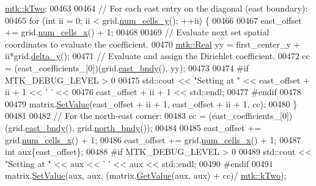 \begin{DoxyCode}
      \hyperlink{group__c01-roots_gaf39c2d851a2db744f4feb1c5ab3ec2cf}{mtk::kTwo};
00463 
00464     \textcolor{comment}{// For each east entry on the diagonal (east boundary):}
00465     \textcolor{keywordflow}{for} (\textcolor{keywordtype}{int} ii = 0; ii < grid.\hyperlink{classmtk_1_1UniStgGrid2D_aed05a801cc9a76dba0ff203cea58a61a}{num\_cells\_y}(); ++ii) \{
00466 
00467       east\_offset += grid.\hyperlink{classmtk_1_1UniStgGrid2D_a2d182866a398aba8e4829590e85bf939}{num\_cells\_x}() + 1;
00468 
00469       \textcolor{comment}{// Evaluate next set spatial coordinates to evaluate the coefficient.}
00470       \hyperlink{group__c01-roots_gac080bbbf5cbb5502c9f00405f894857d}{mtk::Real} yy = first\_center\_y + ii*grid.\hyperlink{classmtk_1_1UniStgGrid2D_a65a78cfc80ffdbeb282ed57af4dc5cb4}{delta\_y}();
00471       \textcolor{comment}{// Evaluate and assign the Dirichlet coefficient.}
00472       cc = (east\_coefficients\_[0])(grid.\hyperlink{classmtk_1_1UniStgGrid2D_a03f689eb29a6369b82ce1207c655d5ff}{east\_bndy}(), yy);
00473 
00474 \textcolor{preprocessor}{      #if MTK\_DEBUG\_LEVEL > 0}
00475       std::cout << \textcolor{stringliteral}{"Setting at "} << east\_offset + ii + 1 << \textcolor{charliteral}{' '} <<
00476         east\_offset + ii + 1 << std::endl;
00477 \textcolor{preprocessor}{      #endif}
00478 
00479       matrix.\hyperlink{classmtk_1_1DenseMatrix_a784ce5784109ac86bfb9d8562b334b13}{SetValue}(east\_offset + ii + 1, east\_offset + ii + 1, cc);
00480     \}
00481 
00482     \textcolor{comment}{// For the north-east corner:}
00483     cc = (east\_coefficients\_[0])(grid.\hyperlink{classmtk_1_1UniStgGrid2D_a03f689eb29a6369b82ce1207c655d5ff}{east\_bndy}(), grid.\hyperlink{classmtk_1_1UniStgGrid2D_afe1ead253cdeb5503e0489eba8fd84e2}{north\_bndy}());
00484 
00485     east\_offset += grid.\hyperlink{classmtk_1_1UniStgGrid2D_a2d182866a398aba8e4829590e85bf939}{num\_cells\_x}() + 1;
00486     east\_offset += grid.\hyperlink{classmtk_1_1UniStgGrid2D_a2d182866a398aba8e4829590e85bf939}{num\_cells\_x}() + 1;
00487     \textcolor{keywordtype}{int} aux\{east\_offset\};
00488 \textcolor{preprocessor}{    #if MTK\_DEBUG\_LEVEL > 0}
00489     std::cout << \textcolor{stringliteral}{"Setting at "} << aux << \textcolor{charliteral}{' '} << aux << std::endl;
00490 \textcolor{preprocessor}{    #endif}
00491     matrix.\hyperlink{classmtk_1_1DenseMatrix_a784ce5784109ac86bfb9d8562b334b13}{SetValue}(aux, aux, (matrix.\hyperlink{classmtk_1_1DenseMatrix_a4b23ecbebd970b5eea915dbb50691024}{GetValue}(aux, aux) + cc)/
      \hyperlink{group__c01-roots_gaf39c2d851a2db744f4feb1c5ab3ec2cf}{mtk::kTwo});

\end{DoxyCode}
